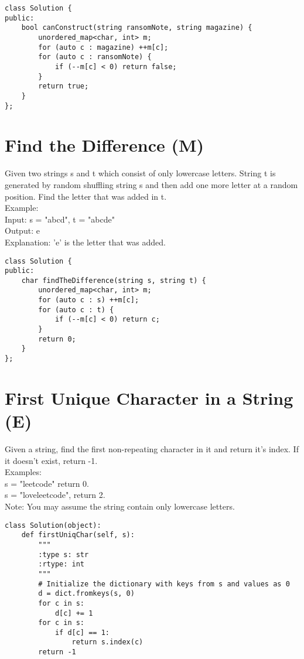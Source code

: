 \begin{lstlisting}
class Solution {
public:
    bool canConstruct(string ransomNote, string magazine) {
        unordered_map<char, int> m;
        for (auto c : magazine) ++m[c];
        for (auto c : ransomNote) {
            if (--m[c] < 0) return false;
        }
        return true;
    }
};
\end{lstlisting}


\section{Find the Difference (M)}
Given two strings s and t which consist of only lowercase letters. String t is generated by random shuffling string s and then add one more letter at a random position. Find the letter that was added in t. \\

Example:\\
Input: s = "abcd", t = "abcde"\\
Output: e\\
Explanation: 'e' is the letter that was added.\\

\begin{lstlisting}
class Solution {
public:
    char findTheDifference(string s, string t) {
        unordered_map<char, int> m;
        for (auto c : s) ++m[c];
        for (auto c : t) {
            if (--m[c] < 0) return c;
        }
        return 0;
    }
};
\end{lstlisting}


\section{First Unique Character in a String (E)}
Given a string, find the first non-repeating character in it and return it's index. If it doesn't exist, return -1.\\

Examples:\\
s = "leetcode"
return 0.\\
s = "loveleetcode",
return 2.\\

Note: You may assume the string contain only lowercase letters. \\

\begin{lstlisting}
class Solution(object):
    def firstUniqChar(self, s):
        """
        :type s: str
        :rtype: int
        """
        # Initialize the dictionary with keys from s and values as 0
        d = dict.fromkeys(s, 0)
        for c in s:
            d[c] += 1
        for c in s:
            if d[c] == 1:
                return s.index(c)
        return -1
\end{lstlisting}
        

